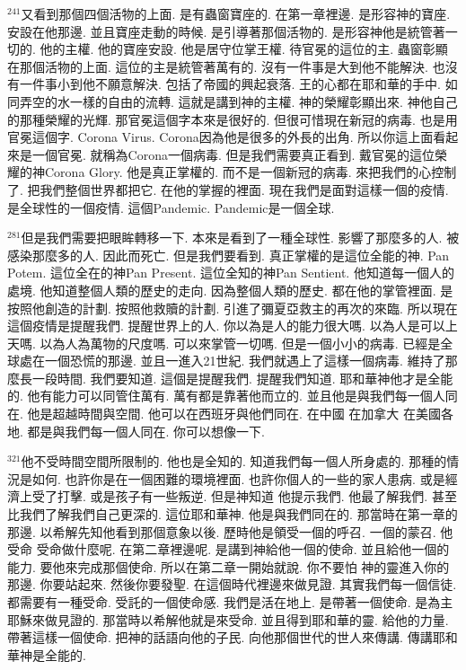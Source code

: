 \documentclass{book}
\begin{document}
$^{241}$又看到那個四個活物的上面.
是有蟲窗寶座的.
在第一章裡邊.
是形容神的寶座.
安設在他那邊.
並且寶座走動的時候.
是引導著那個活物的.
是形容神他是統管著一切的.
他的主權.
他的寶座安設.
他是居守位掌王權.
待官冕的這位的主.
蟲窗彰顯在那個活物的上面.
這位的主是統管著萬有的.
沒有一件事是大到他不能解決.
也沒有一件事小到他不願意解決.
包括了帝國的興起衰落.
王的心都在耶和華的手中.
如同弄空的水一樣的自由的流轉.
這就是講到神的主權.
神的榮耀彰顯出來.
神他自己的那種榮耀的光輝.
那官冕這個字本來是很好的.
但很可惜現在新冠的病毒.
也是用官冕這個字.
Corona Virus.
Corona因為他是很多的外長的出角.
所以你這上面看起來是一個官冕.
就稱為Corona一個病毒.
但是我們需要真正看到.
戴官冕的這位榮耀的神Corona Glory.
他是真正掌權的.
而不是一個新冠的病毒.
來把我們的心控制了.
把我們整個世界都把它.
在他的掌握的裡面.
現在我們是面對這樣一個的疫情.
是全球性的一個疫情.
這個Pandemic.
Pandemic是一個全球.

$^{281}$但是我們需要把眼眸轉移一下.
本來是看到了一種全球性.
影響了那麼多的人.
被感染那麼多的人.
因此而死亡.
但是我們要看到.
真正掌權的是這位全能的神.
Pan Potem.
這位全在的神Pan Present.
這位全知的神Pan Sentient.
他知道每一個人的處境.
他知道整個人類的歷史的走向.
因為整個人類的歷史.
都在他的掌管裡面.
是按照他創造的計劃.
按照他救贖的計劃.
引進了彌夏亞救主的再次的來臨.
所以現在這個疫情是提醒我們.
提醒世界上的人.
你以為是人的能力很大嗎.
以為人是可以上天嗎.
以為人為萬物的尺度嗎.
可以來掌管一切嗎.
但是一個小小的病毒.
已經是全球處在一個恐慌的那邊.
並且一進入21世紀.
我們就遇上了這樣一個病毒.
維持了那麼長一段時間.
我們要知道.
這個是提醒我們.
提醒我們知道.
耶和華神他才是全能的.
他有能力可以同管住萬有.
萬有都是靠著他而立的.
並且他是與我們每一個人同在.
他是超越時間與空間.
他可以在西班牙與他們同在.
在中國 在加拿大 在美國各地.
都是與我們每一個人同在.
你可以想像一下.

$^{321}$他不受時間空間所限制的.
他也是全知的.
知道我們每一個人所身處的.
那種的情況是如何.
也許你是在一個困難的環境裡面.
也許你個人的一些的家人患病.
或是經濟上受了打擊.
或是孩子有一些叛逆.
但是神知道 他提示我們.
他最了解我們.
甚至比我們了解我們自己更深的.
這位耶和華神.
他是與我們同在的.
那當時在第一章的那邊.
以希解先知他看到那個意象以後.
歷時他是領受一個的呼召.
一個的蒙召.
他受命 受命做什麼呢.
在第二章裡邊呢.
是講到神給他一個的使命.
並且給他一個的能力.
要他來完成那個使命.
所以在第二章一開始就說.
你不要怕 神的靈進入你的那邊.
你要站起來.
然後你要發聖.
在這個時代裡邊來做見證.
其實我們每一個信徒.
都需要有一種受命.
受託的一個使命感.
我們是活在地上.
是帶著一個使命.
是為主耶穌來做見證的.
那當時以希解他就是來受命.
並且得到耶和華的靈.
給他的力量.
帶著這樣一個使命.
把神的話語向他的子民.
向他那個世代的世人來傳講.
傳講耶和華神是全能的.
\end{document}

